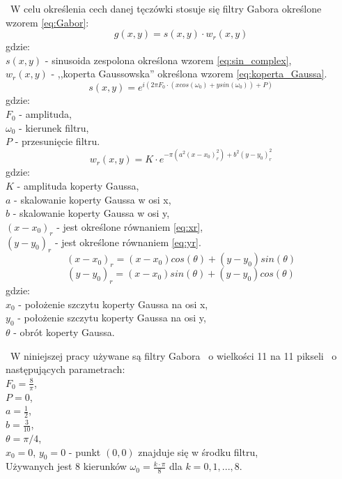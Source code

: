 ~W celu określenia cech danej tęczówki stosuje się filtry Gabora określone wzorem \ref{eq:Gabor}:
\begin{equation}
\label{eq:Gabor}
g(x,y) = s(x,y)\cdot w_{r}(x,y)
\end{equation}
gdzie:\\
$s(x,y)$ - sinusoida zespolona określona wzorem \ref{eq:sin_complex},\\
$w_{r}(x,y)$ - ,,koperta Gaussowska'' określona wzorem \ref{eq:koperta_Gaussa}.\\
\begin{equation}
\label{eq:sin_complex}
s(x,y) = e^{i(2 \pi F_{0} \cdot (xcos(\omega_{0}) + ysin(\omega_{0})) + P)}
\end{equation}
gdzie:\\
$F_{0}$ - amplituda,\\
$\omega_{0}$ - kierunek filtru,\\
$P$ - przesunięcie filtru.\\
\begin{equation}
\label{eq:koperta_Gaussa}
w_{r}(x,y) = K \cdot e^{-\pi(a^{2}(x-x_{0})_{r}^{2}) + b^{2}(y-y_{0})_{r}^{2}}
\end{equation}
gdzie:\\
$K$ - amplituda koperty Gaussa,\\
$a$ - skalowanie koperty Gaussa w osi x,\\
$b$ - skalowanie koperty Gaussa w osi y,\\
$(x-x_{0})_{r}$ - jest określone równaniem \ref{eq:xr},\\
$(y-y_{0})_{r}$ - jest określone równaniem \ref{eq:yr}.\\
\begin{equation}
\label{eq:xr}
(x-x_{0})_{r} = (x-x_{0})cos(\theta)+(y-y_{0})sin(\theta)
\end{equation}
\begin{equation}
\label{eq:yr}
(y-y_{0})_{r} = (x-x_{0})sin(\theta)+(y-y_{0})cos(\theta)
\end{equation}
gdzie:\\
$x_{0}$ - położenie szczytu koperty Gaussa na osi x,\\
$y_{0}$ - położenie szczytu koperty Gaussa na osi y,\\
$\theta$ - obrót koperty Gaussa.

~W niniejszej pracy używane są filtry Gabora ~o wielkości 11 na 11 pikseli ~o następujących parametrach:\\
$F_{0} = \frac{8}{\pi}$,\\
$P = 0$,\\
$a = \frac{1}{2}$,\\
$b = \frac{3}{10}$,\\
$\theta = \pi / 4$,\\
$x_{0} = 0$, $y_{0} = 0$ - punkt $(0,0)$ znajduje się w środku filtru,\\
Używanych jest 8 kierunków $\omega_{0} =\frac {k \cdot \pi} {8} $ dla $k = 0, 1, ..., 8$.

